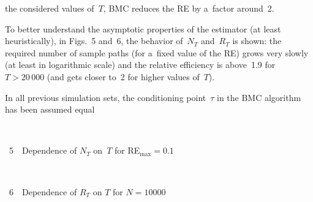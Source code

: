 \begin{multicols}{2}
\vspace*{9pt}



\noindent
 the considered values of~$T$, BMC reduces the RE by a~factor around~2.





To better understand the asymptotic properties of the estimator 
(at least heuristically), in Figs.~5 and~6, 
the behavior of~$N_T$ and~$R_T$ is shown: the required number of sample paths (for a~fixed 
value of the RE) grows very slowly (at least in logarithmic scale) and the relative 
efficiency is above~1.9 for $T > 20\,000$ (and gets closer to~2 for higher values 
of~$T$).



In all previous simulation sets, the conditioning point~$\tau$ in the BMC 
algorithm has been assumed equal\linebreak\vspace*{-12pt}

 { \begin{center}  %
 \vspace*{12pt}
 \mbox{%
\epsfxsize=77.933mm
}


\vspace*{3pt}


\noindent
{{\figurename~5}\ \ \small{Dependence of $N_T$ on~$T$ for RE$_{\max}=0.1$}}

\end{center}
}


 { \begin{center}  %
 \vspace*{12pt}
\mbox{%
\epsfxsize=78.326mm
}


\vspace*{3pt}


\noindent
{{\figurename~6}\ \ \small{Dependence of $R_T$ on $T$ for $N=10000$}}

\end{center}
}



{ \begin{center}  %
 \vspace*{1pt}
\mbox{%
\epsfxsize=76.181mm
}


\vspace*{3pt}



\end{center}}
\end{multicols}
